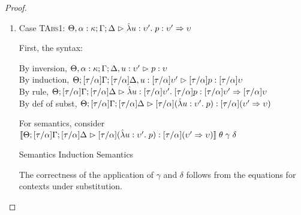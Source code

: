\begin{proof}
\begin{enumerate}
  Next, consider $\interp{\judgeA[\Theta; {[\tau/\alpha]}\Gamma; {[\tau/\alpha]}\Delta]{u}{{[\tau/\alpha]}A}}\;\theta\;\gamma\;\delta$\\
  \begin{eqnproof}
          {Semantics}
  \end{eqnproof}
  The correctness of the application of $\gamma$ and $\delta$ follows from the equations for contexts
  under substitution. 

\item Case \textsc{TAbs1}: $\judgeA[\Theta, \alpha:\kappa; \Gamma; \Delta]{\pfun{u}{\upsilon'}{p}}{\upsilon' \To \upsilon}$
  
  First, the syntax:
  \begin{tabbedproof}
    \oo By inversion, $\judgeA[\Theta, \alpha:\kappa; \Gamma; \Delta, u:\upsilon']{p}{\upsilon}$ \\
    \oo By induction, $\judgeA[\Theta; {[\tau/\alpha]}\Gamma; {[\tau/\alpha]}\Delta, u:{[\tau/\alpha]}\upsilon']{{[\tau/\alpha]}p}{{[\tau/\alpha]}\upsilon}$ \\
    \oo By rule, $\judgeA[\Theta; {[\tau/\alpha]}\Gamma; {[\tau/\alpha]}\Delta]{\pfun{u}{{[\tau/\alpha]}\upsilon'}{{[\tau/\alpha]}p}}{{[\tau/\alpha]}\upsilon' \To {[\tau/\alpha]}\upsilon}$ \\
    \oo By def of subst, $\judgeA[\Theta; {[\tau/\alpha]}\Gamma; {[\tau/\alpha]}\Delta]{{[\tau/\alpha]}(\pfun{u}{\upsilon'}{p})}{{[\tau/\alpha]}(\upsilon' \To \upsilon)}$ \\
  \end{tabbedproof}
  For semantics, consider $\interp{\judgeA[\Theta; {[\tau/\alpha]}\Gamma; {[\tau/\alpha]}\Delta]{{[\tau/\alpha]}(\pfun{u}{\upsilon'}{p})}{{[\tau/\alpha]}(\upsilon' \To \upsilon)}}\;\theta\;\gamma\;\delta$ \\
  \begin{eqnproof}
          {Semantics}
          {Induction}
          {Semantics}
  \end{eqnproof}
  The correctness of the application of $\gamma$ and $\delta$ follows from the equations for contexts
  under substitution. 


\end{enumerate}
\end{proof}
